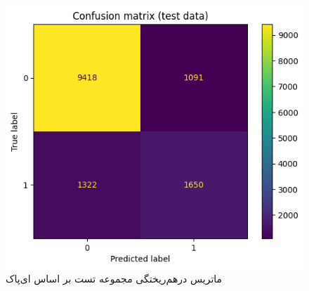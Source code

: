 \documentclass{article}
\begin{document}
\begin{figure}[!h]
    \centering\includegraphics[scale=.55]{./p6-4}
    \caption{ماتریس درهم‌ریختگی مجموعه تست بر اساس ای‌پاک}\label{fig.64}
\end{figure}

\cleardoublepage
\end{document}

